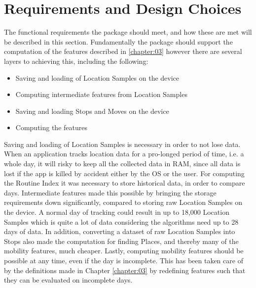 \section{Requirements and Design Choices}
The functional requirements the package should meet, and how these are met will be described in this section. Fundamentally the package should support the computation of the features described in \ref{chapter:03} however there are several layers to achieving this, including the following:

\begin{itemize}
    \item Saving and loading of Location Samples on the device
    \item Computing intermediate features from Location Samples
    \item Saving and loading Stops and Moves on the device
    \item Computing the features
\end{itemize}

Saving and loading of Location Samples is necessary in order to not lose data. When an application tracks location data for a pro-longed period of time, i.e. a whole day, it will risky to keep all the collected data in RAM, since all data is lost if the app is killed by accident either by the OS or the user. For computing the Routine Index it was necessary to store historical data, in order to compare days. Intermediate features made this possible by bringing the storage requirements down significantly, compared to storing raw Location Samples on the device. A normal day of tracking could result in up to 18,000 Location Samples which is quite a lot of data considering the algorithms need up to 28 days of data. In addition, converting a dataset of raw Location Samples into Stops also made the computation for finding Places, and thereby many of the mobility features, much cheaper. Lastly, computing mobility features should be possible at any time, even if the day is incomplete. This has been taken care of by the definitions made in Chapter \ref{chapter:03} by redefining features such that they can be evaluated on incomplete days.


